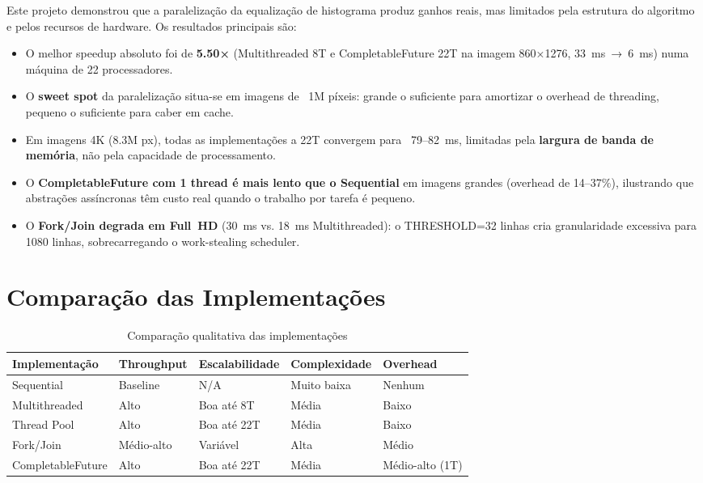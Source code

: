 \documentclass[a4paper,11pt,openright,BCOR=15mm]{scrbook}
\begin{document}
Este projeto demonstrou que a paralelização da equalização de histograma produz ganhos reais, mas limitados pela estrutura do algoritmo e pelos recursos de hardware. Os resultados principais são:

\begin{itemize}
    \item O melhor speedup absoluto foi de \textbf{5.50×} (Multithreaded 8T e CompletableFuture 22T na imagem 860×1276, 33~ms~→~6~ms) numa máquina de 22 processadores.
    \item O \textbf{sweet spot} da paralelização situa-se em imagens de ~1M píxeis: grande o suficiente para amortizar o overhead de threading, pequeno o suficiente para caber em cache.
    \item Em imagens 4K (8.3M px), todas as implementações a 22T convergem para ~79--82~ms, limitadas pela \textbf{largura de banda de memória}, não pela capacidade de processamento.
    \item O \textbf{CompletableFuture com 1 thread é mais lento que o Sequential} em imagens grandes (overhead de 14--37\%), ilustrando que abstrações assíncronas têm custo real quando o trabalho por tarefa é pequeno.
    \item O \textbf{Fork/Join degrada em Full~HD} (30~ms vs. 18~ms Multithreaded): o THRESHOLD=32 linhas cria granularidade excessiva para 1080 linhas, sobrecarregando o work-stealing scheduler.
\end{itemize}

\section{Comparação das Implementações}

\begin{table}[H]
    \centering
    \caption{Comparação qualitativa das implementações}
    \label{tab:qualitative}
    \begin{tabular}{lllll}
        \toprule
        \textbf{Implementação} & \textbf{Throughput} & \textbf{Escalabilidade} & \textbf{Complexidade} & \textbf{Overhead} \\
        \midrule
        Sequential       & Baseline  & N/A         & Muito baixa & Nenhum \\
        Multithreaded    & Alto      & Boa até 8T  & Média       & Baixo \\
        Thread Pool      & Alto      & Boa até 22T & Média       & Baixo \\
        Fork/Join        & Médio-alto & Variável   & Alta        & Médio \\
        CompletableFuture & Alto     & Boa até 22T & Média       & Médio-alto (1T) \\
        \bottomrule
    \end{tabular}
\end{table}
\end{document}
